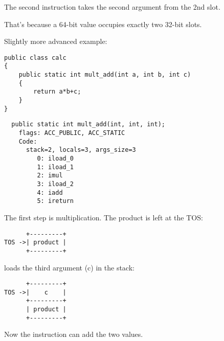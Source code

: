 The second  instruction takes the second argument from the 2nd slot.

That's because a 64-bit  value occupies exactly two 32-bit slots.


Slightly more advanced example:


\begin{lstlisting}[style=customjava]
public class calc
{
	public static int mult_add(int a, int b, int c)
	{
		return a*b+c;
	}
}
\end{lstlisting}

\begin{lstlisting}
  public static int mult_add(int, int, int);
    flags: ACC_PUBLIC, ACC_STATIC
    Code:
      stack=2, locals=3, args_size=3
         0: iload_0       
         1: iload_1       
         2: imul          
         3: iload_2       
         4: iadd          
         5: ireturn       
\end{lstlisting}

The first step is multiplication. The product is left at the \ac{TOS}:


\begin{lstlisting}
      +---------+
TOS ->| product |
      +---------+
\end{lstlisting}

 loads the third argument (c) in the stack:

\begin{lstlisting}
      +---------+
TOS ->|    c    |
      +---------+
      | product |
      +---------+
\end{lstlisting}

Now the  instruction can add the two values.


